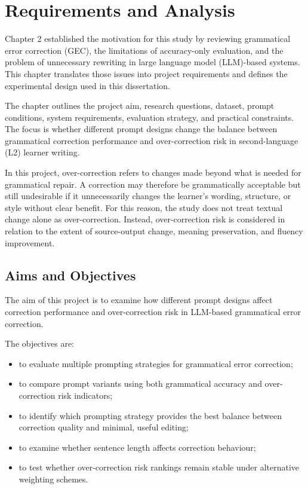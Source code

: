 \chapter{Requirements and Analysis}

Chapter 2 established the motivation for this study by reviewing grammatical error correction (GEC), the limitations of accuracy-only evaluation, and the problem of unnecessary rewriting in large language model (LLM)-based systems. This chapter translates those issues into project requirements and defines the experimental design used in this dissertation.

The chapter outlines the project aim, research questions, dataset, prompt conditions, system requirements, evaluation strategy, and practical constraints. The focus is whether different prompt designs change the balance between grammatical correction performance and over-correction risk in second-language (L2) learner writing.

In this project, over-correction refers to changes made beyond what is needed for grammatical repair. A correction may therefore be grammatically acceptable but still undesirable if it unnecessarily changes the learner's wording, structure, or style without clear benefit. For this reason, the study does not treat textual change alone as over-correction. Instead, over-correction risk is considered in relation to the extent of source-output change, meaning preservation, and fluency improvement.

\section{Aims and Objectives}

The aim of this project is to examine how different prompt designs affect correction performance and over-correction risk in LLM-based grammatical error correction.

The objectives are:

\begin{itemize}
    \item to evaluate multiple prompting strategies for grammatical error correction;
    \item to compare prompt variants using both grammatical accuracy and over-correction risk indicators;
    \item to identify which prompting strategy provides the best balance between correction quality and minimal, useful editing;
    \item to examine whether sentence length affects correction behaviour;
    \item to test whether over-correction risk rankings remain stable under alternative weighting schemes.
\end{itemize}

